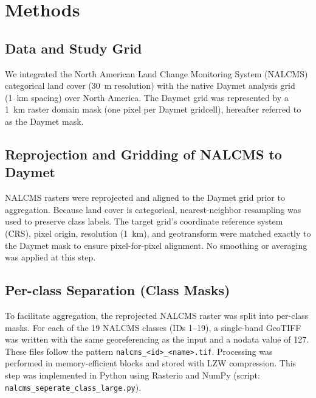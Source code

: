 \section{Methods}

\subsection{Data and Study Grid}
We integrated the North American Land Change Monitoring System (NALCMS) categorical land cover (30~m resolution) with the native Daymet analysis grid (1~km spacing) over North America. The Daymet grid was represented by a 1~km raster domain mask (one pixel per Daymet gridcell), hereafter referred to as the Daymet mask.

\subsection{Reprojection and Gridding of NALCMS to Daymet}
NALCMS rasters were reprojected and aligned to the Daymet grid prior to aggregation. Because land cover is categorical, nearest-neighbor resampling was used to preserve class labels. The target grid's coordinate reference system (CRS), pixel origin, resolution (1~km), and geotransform were matched exactly to the Daymet mask to ensure pixel-for-pixel alignment. No smoothing or averaging was applied at this step.

\subsection{Per-class Separation (Class Masks)}
To facilitate aggregation, the reprojected NALCMS raster was split into per-class masks. For each of the 19 NALCMS classes (IDs 1--19), a single-band GeoTIFF was written with the same georeferencing as the input and a nodata value of 127. These files follow the pattern \texttt{nalcms\_\textless id\textgreater\_\textless name\textgreater.tif}. Processing was performed in memory-efficient blocks and stored with LZW compression. This step was implemented in Python using Rasterio and NumPy (script: \texttt{nalcms\_seperate\_class\_large.py}).

